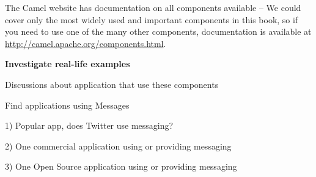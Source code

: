 \documentclass[Screen16to9,17pt]{foils}
\begin{document}


The Camel website has documentation on all components available -- We could cover
only the most widely used and important components in this book, so if you need
to use one of the many other components, documentation is available at
\url{http://camel.apache.org/components.html}.





{\bf Investigate real-life examples}

Discussions about application that use these components

Find applications using Messages

1) Popular app, does Twitter use messaging?

2) One commercial application using or providing messaging

3) One Open Source application using or providing messaging



\slidenext
\end{document}
